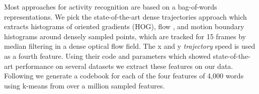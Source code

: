 Most approaches  for activity recognition are based on a  bag-of-words representations. We pick the state-of-the-art dense trajectories  approach \citep{wang11cvpr,wang13ijcv} which extracts histograms of oriented gradients (HOG), flow \citep[HOF][]{laptev08cvpr}, and motion boundary histograms \citep[MBH][]{dalal06eccv} around densely sampled points, which are tracked for 15 frames by median filtering in a dense optical flow field. The x and y \emph{trajectory} speed is used as a fourth feature. Using their code and parameters which showed state-of-the-art performance on several datasets we extract these features on our data.  
%
Following \citet{wang11cvpr} we generate a codebook for each of the four features of 4,000 words using k-means from over a million sampled features.
